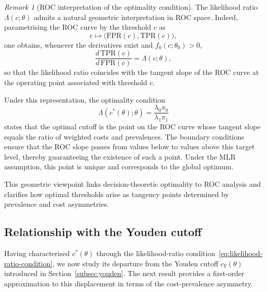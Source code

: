 \documentclass[11pt,a4paper]{article}
\theoremstyle{definition}
\theoremstyle{remark}
\newtheorem{remark}[theorem]{Remark}
\newcommand{\1}{\mathbf{1}}
\begin{document}
\begin{remark}[ROC interpretation of the optimality condition]
\label{rem:roc-geometry}
\normalfont
The likelihood ratio $\Lambda(c;\theta)$ admits a natural
geometric interpretation in ROC space. Indeed, parametrising
the ROC curve by the threshold $c$ as
\[
c \mapsto \bigl(\mathrm{FPR}(c), \mathrm{TPR}(c)\bigr),
\]
one obtains, whenever the derivatives exist and
$f_0(c;\theta_0)>0$,
\[
\frac{d\,\mathrm{TPR}(c)}{d\,\mathrm{FPR}(c)}
=
\Lambda(c;\theta),
\]
so that the likelihood ratio coincides with the tangent slope
of the ROC curve at the operating point associated with
threshold $c$.

\noindent
Under this representation, the optimality condition
\[
\Lambda(c^*(\theta);\theta)
=
\frac{\lambda_0\pi_0}{\lambda_1\pi_1}
\]
states that the optimal cutoff is the point on the ROC curve
whose tangent slope equals the ratio of weighted costs and
prevalences. The boundary conditions ensure that the ROC slope
passes from values below to values above this target level,
thereby guaranteeing the existence of such a point. Under the
MLR assumption, this point is unique and corresponds to the
global optimum.

This geometric viewpoint links decision-theoretic optimality to
ROC analysis and clarifies how optimal thresholds arise as
tangency points determined by prevalence and cost asymmetries.
\end{remark}

\subsection{Relationship with the Youden cutoff}
\label{subsec:youden-relationship}

Having characterised $c^*(\theta)$ through the
likelihood-ratio condition~\eqref{eq:likelihood-ratio-condition},
we now study its departure from the Youden cutoff
$c_Y(\theta)$ introduced in Section~\ref{subsec:youden}.
The next result provides a first-order approximation to this
displacement in terms of the cost-prevalence asymmetry.
\end{document}
